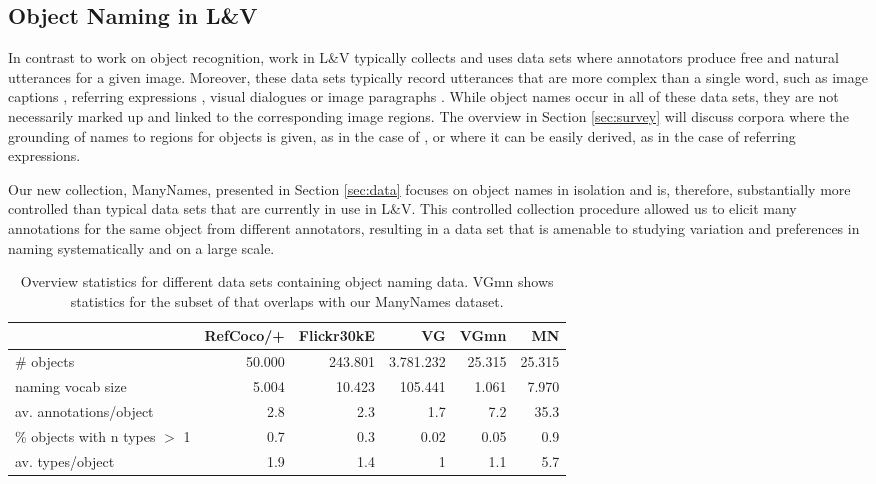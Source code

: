 \subsection{Object Naming in L\&V} 

In contrast to work on object recognition, work in L\&V typically collects and uses data sets where annotators produce free and natural utterances for a given image. 
Moreover, these data sets typically record utterances that are more complex than a single word, such as image captions \cite{fangetal:2015,devlin:imcaqui,Bernardietal:automatic}, referring expressions \cite{Kazemzadeh2014,mao15,Yu2016}, visual dialogues \cite{das2017visual,vries2017guesswhat} or image paragraphs \cite{krause2017hierarchical}. While object names occur in all of these data sets, they are not necessarily marked up and linked to the corresponding image regions. The overview in Section \ref{sec:survey} will discuss corpora where the grounding of names to regions for objects is given, as in the case of \vgenome \cite{krishna2016visualgenome}, or where it can be easily derived, as in the case of referring expressions.

Our new collection, ManyNames, presented in Section \ref{sec:data} focuses on object names in isolation and is, therefore, substantially more controlled than typical data sets that are currently in use in L\&V. This controlled collection procedure allowed us to elicit many annotations for the same object from different annotators, resulting in a data set that is amenable to studying variation and preferences in naming systematically and on a large scale.

\begin{table*}[htb]
  \centering
  \begin{tabular}{lrrrrr}
    \toprule
    &   RefCoco/+  &  Flickr30kE &           VG &      VGmn &        MN \\
    \midrule
    \# objects & 50.000 & 243.801 & 3.781.232 & 25.315 & 25.315 \\
    naming vocab size &  5.004 &  10.423 &   105.441 &  1.061 &  7.970 \\
    av. annotations/object &      2.8 &       2.3 &         1.7 &      7.2 &     35.3 \\
    \% objects with n types $>$ 1 &      0.7 &       0.3 &         0.02 &      0.05 &      0.9 \\
    av. types/object &      1.9 &       1.4 &         1 &      1.1 &      5.7 \\
    \bottomrule
  \end{tabular}
  \caption{Overview statistics for different data sets containing object naming data. VGmn shows statistics for the subset of \vg that overlaps with our ManyNames dataset.\label{tab:compare}}
\end{table*}


